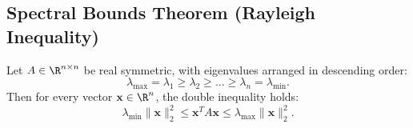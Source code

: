 \subsection{Spectral Bounds Theorem (Rayleigh Inequality)}

\begin{theorem}
\label{thm:spectral-bounds}
Let $A \in \R^{n \times n}$ be real symmetric, with eigenvalues arranged in descending order:
\begin{equation}
    \lambda_{\max} = \lambda_1 \ge \lambda_2 \ge \dots \ge \lambda_n = \lambda_{\min}.
\end{equation}
Then for every vector $\mathbf{x} \in \R^n$, the double inequality holds:
\begin{equation}
    \lambda_{\min} \|\mathbf{x}\|_2^2 \le \mathbf{x}^T A \mathbf{x} \le \lambda_{\max} \|\mathbf{x}\|_2^2.
\end{equation}
\end{theorem}

